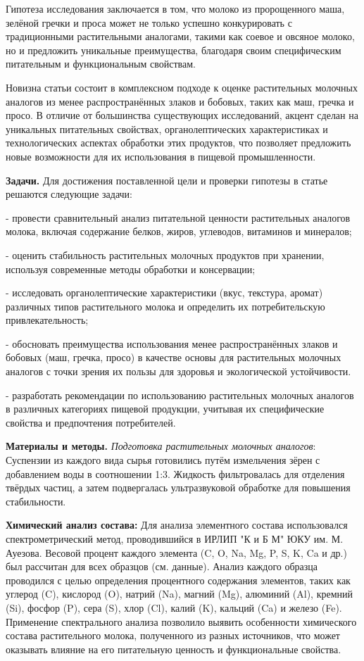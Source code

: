 \begin{multicols}{2}
Гипотеза исследования заключается в том, что молоко из пророщенного
маша, зелёной гречки и проса может не только успешно конкурировать с
традиционными растительными аналогами, такими как соевое и овсяное
молоко, но и предложить уникальные преимущества, благодаря своим
специфическим питательным и функциональным свойствам.

Новизна статьи состоит в комплексном подходе к оценке растительных
молочных аналогов из менее распространённых злаков и бобовых, таких как
маш, гречка и просо. В отличие от большинства существующих исследований,
акцент сделан на уникальных питательных свойствах, органолептических
характеристиках и технологических аспектах обработки этих продуктов, что
позволяет предложить новые возможности для их использования в пищевой
промышленности.

{\bfseries Задачи.} Для достижения поставленной цели и проверки гипотезы в
статье решаются следующие задачи:

- провести сравнительный анализ питательной ценности растительных
аналогов молока, включая содержание белков, жиров, углеводов, витаминов
и минералов;

- оценить стабильность растительных молочных продуктов при хранении,
используя современные методы обработки и консервации;

- исследовать органолептические характеристики (вкус, текстура, аромат)
различных типов растительного молока и определить их потребительскую
привлекательность;

- обосновать преимущества использования менее распространённых злаков и
бобовых (маш, гречка, просо) в качестве основы для растительных молочных
аналогов с точки зрения их пользы для здоровья и экологической
устойчивости.

- разработать рекомендации по использованию растительных молочных
аналогов в различных категориях пищевой продукции, учитывая их
специфические свойства и предпочтения потребителей.

{\bfseries Материалы и методы.} \emph{Подготовка растительных молочных
аналогов}: Суспензии из каждого вида сырья готовились путём
измельчения зёрен с добавлением воды в соотношении 1:3. Жидкость
фильтровалась для отделения твёрдых частиц, а затем подвергалась
ультразвуковой обработке для повышения стабильности.

{\bfseries Химический анализ состава:} Для анализа элементного состава
использовался спектрометрический метод, проводившийся в ИРЛИП "К и Б М"
ЮКУ им. М. Ауезова. Весовой процент каждого элемента (C, O, Na, Mg, P,
S, K, Ca и др.) был рассчитан для всех образцов (см. данные). Анализ
каждого образца проводился с целью определения процентного содержания
элементов, таких как углерод (C), кислород (O), натрий (Na), магний
(Mg), алюминий (Al), кремний (Si), фосфор (P), сера (S), хлор (Cl),
калий (K), кальций (Ca) и железо (Fe). Применение спектрального анализа
позволило выявить особенности химического состава растительного молока,
полученного из разных источников, что может оказывать влияние на его
питательную ценность и функциональные свойства.


\end{multicols}
